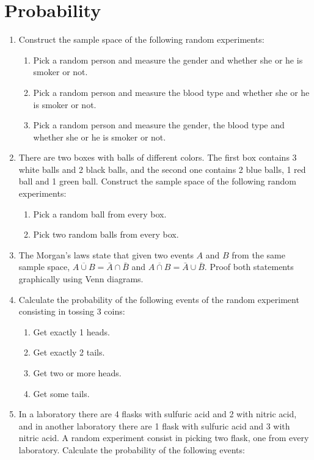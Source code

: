 
\section{Probability}
\begin{enumerate}[leftmargin=*,resume]
\item Construct the sample space of the following random experiments:
\begin{enumerate}
\item Pick a random person and measure the gender and whether she or he is smoker or not. 
\item Pick a random person and measure the blood type and whether she or he is smoker or not.
\item Pick a random person and measure the gender, the blood type and whether she or he is smoker or not.
\end{enumerate}

\item There are two boxes with balls of different colors. 
The first box contains 3 white balls and 2 black balls, and the second one contains 2 blue balls, 1 red ball and 1 green
ball. 
Construct the sample space of the following random experiments:
\begin{enumerate}
\item Pick a random ball from every box. 
\item Pick two random balls from every box.
\end{enumerate}

\item The Morgan's laws state that given two events $A$ and $B$ from the same sample space, $\overline{A\cup B}=\bar A
\cap \bar B$ and $\overline{A\cap B}=\bar A \cup \bar B$.
Proof both statements graphically using Venn diagrams.

\item Calculate the probability of the following events of the random experiment consisting in tossing 3 coins: 
\begin{enumerate}
\item Get exactly 1 heads. 
\item Get exactly 2 tails.
\item Get two or more heads.
\item Get some tails. 
\end{enumerate}

\item In a laboratory there are 4 flasks with sulfuric acid and 2 with nitric acid, and in another laboratory there are
1 flask with sulfuric acid and 3 with nitric acid. 
A random experiment consist in picking two flask, one from every laboratory. 
Calculate the probability of the following events:


\end{enumerate}
